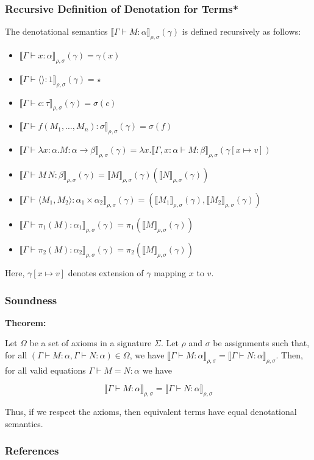 \documentclass[aspectratio=169]{beamer}
\begin{document}
\begin{frame}
\frametitle{Recursive Definition of Denotation for Terms*}

The denotational semantics $\llbracket \Gamma \vdash M : \alpha \rrbracket_{\rho,\sigma} (\gamma)$ is defined recursively as follows:

\begin{itemize}
    \item $\llbracket \Gamma \vdash x : \alpha \rrbracket_{\rho,\sigma} (\gamma) = \gamma(x)$
    \item $\llbracket \Gamma \vdash \langle \rangle : 1 \rrbracket_{\rho,\sigma} (\gamma) = \star$
    \item $\llbracket \Gamma \vdash c : \tau \rrbracket_{\rho,\sigma} (\gamma) = \sigma(c)$
    \item $\llbracket \Gamma \vdash f(M_1, \ldots, M_n) : \sigma \rrbracket_{\rho,\sigma} (\gamma) = \sigma(f)$
    \pause
    \item $\llbracket \Gamma \vdash \lambda x : \alpha. M : \alpha \rightarrow \beta \rrbracket_{\rho,\sigma} (\gamma) = \lambda x. \llbracket \Gamma, x:\alpha \vdash M : \beta \rrbracket_{\rho,\sigma} (\gamma[x \mapsto v])$
    \pause
    \item $\llbracket \Gamma \vdash M \, N : \beta \rrbracket_{\rho,\sigma} (\gamma) = \llbracket M \rrbracket_{\rho,\sigma}(\gamma)(\llbracket N \rrbracket_{\rho,\sigma}(\gamma))$
    \item $\llbracket \Gamma \vdash \langle M_1, M_2 \rangle : \alpha_1 \times \alpha_2 \rrbracket_{\rho,\sigma} (\gamma) = (\llbracket M_1 \rrbracket_{\rho,\sigma}(\gamma), \llbracket M_2 \rrbracket_{\rho,\sigma}(\gamma))$
    \item $\llbracket \Gamma \vdash \pi_1(M) : \alpha_1 \rrbracket_{\rho,\sigma} (\gamma) = \pi_1(\llbracket M \rrbracket_{\rho,\sigma}(\gamma))$
    \item $\llbracket \Gamma \vdash \pi_2(M) : \alpha_2 \rrbracket_{\rho,\sigma} (\gamma) = \pi_2(\llbracket M \rrbracket_{\rho,\sigma}(\gamma))$
\end{itemize}

Here, $\gamma[x \mapsto v]$ denotes extension of $\gamma$ mapping $x$ to $v$.
\end{frame}

\begin{frame}
\frametitle{Soundness}

\textbf{Theorem:}

Let $\Omega$ be a set of axioms in a signature $\Sigma$.
Let $\rho$ and $\sigma$ be assignments such that, for all $\left(\Gamma \vdash M : \alpha, \Gamma \vdash N : \alpha\right) \in \Omega$, we have $\llbracket \Gamma \vdash M : \alpha \rrbracket_{\rho, \sigma} = \llbracket \Gamma \vdash N : \alpha \rrbracket_{\rho, \sigma}$.
Then, for all valid equations $\Gamma \vdash M = N : \alpha$ we have

\[
\llbracket \Gamma \vdash M : \alpha \rrbracket_{\rho, \sigma} = \llbracket \Gamma \vdash N : \alpha \rrbracket_{\rho, \sigma}
\]

Thus, if we respect the axioms, then equivalent terms have equal denotational semantics.
\end{frame}


\begin{frame}
\frametitle{References}

\printbibliography
\end{frame}
\end{document}
